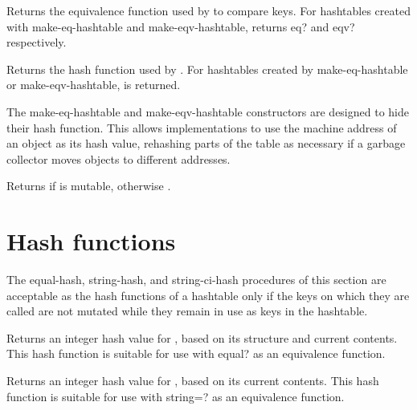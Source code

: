 \begin{entry}{}

Returns the equivalence function used by
 to compare keys.  For hashtables
created with {\cf make-eq-hashtable} and {\cf make-eqv-hashtable},
returns {\cf eq?} and {\cf eqv?} respectively.
\end{entry}

\begin{entry}{}

Returns the hash function used by .
For hashtables created by {\cf make-eq-hashtable} 
or {\cf make-eqv-hashtable}, \schfalse{} is returned.

\begin{rationale}
The {\cf make-eq-hashtable} and {\cf make-eqv-hashtable} constructors
are designed to hide their hash function.  This allows implementations
to use the machine address of an object as its hash value, rehashing
parts of the table as necessary if a garbage collector moves
objects to different addresses.
\end{rationale}
\end{entry}

\begin{entry}{}

Returns \schtrue{} if  is mutable, otherwise \schfalse{}.
\end{entry}

\section{Hash functions}

The {\cf equal-hash}, {\cf string-hash}, and {\cf string-ci-hash}
procedures of this section are acceptable as the hash functions of
a hashtable only if the keys on which they are called are not mutated
while they remain in use as keys in the hashtable.

\begin{entry}{}

Returns an integer hash value for , based on
its structure and current contents.  This hash function is suitable
for use with {\cf equal?} as an equivalence function.
\end{entry}

\begin{entry}{}

Returns an integer hash value for , based on
its current contents.
This hash function is suitable
for use with {\cf string=?} as an equivalence function.
\end{entry}

